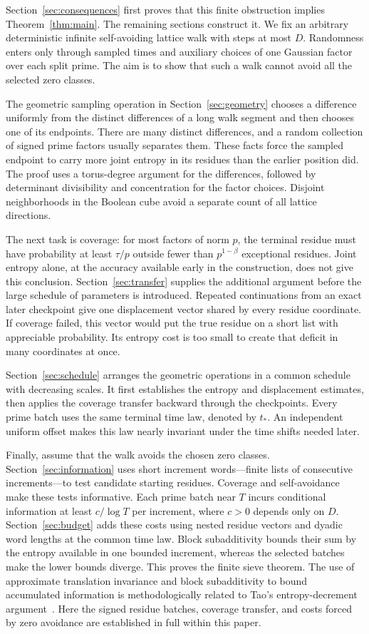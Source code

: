 \documentclass[11pt]{article}
\theoremstyle{definition}
\theoremstyle{remark}
\numberwithin{equation}{section}
\begin{document}
Section~\ref{sec:consequences} first proves that this finite obstruction
implies Theorem~\ref{thm:main}. The remaining sections construct it.
We fix an arbitrary deterministic infinite self-avoiding lattice walk
with steps at most $D$. Randomness enters only through sampled times
and auxiliary choices of one Gaussian factor over each split prime.
The aim is to show that such a walk cannot avoid all the selected zero
classes.

The geometric sampling operation in Section~\ref{sec:geometry} chooses
a difference uniformly from the distinct differences of a long walk
segment and then chooses one of its endpoints. There are many distinct
differences, and a random collection of signed prime factors usually
separates them. These facts force the sampled endpoint to carry more
joint entropy in its residues than the earlier position did. The proof
uses a torus-degree argument for the differences, followed by determinant
divisibility and concentration for the factor choices. Disjoint
neighborhoods in the Boolean cube avoid a separate count of all lattice
directions.

The next task is coverage: for most factors of norm $p$, the terminal
residue must have probability at least $\tau/p$ outside fewer than
$p^{1-\beta}$ exceptional residues. Joint entropy alone, at the accuracy
available early in the construction, does not give this conclusion.
Section~\ref{sec:transfer} supplies the additional argument before the
large schedule of parameters is introduced. Repeated continuations from
an exact later checkpoint give one displacement vector shared by every
residue coordinate. If coverage failed, this vector would put the true
residue on a short list with appreciable probability. Its entropy cost
is too small to create that deficit in many coordinates at once.

Section~\ref{sec:schedule} arranges the geometric operations in a common
schedule with decreasing scales. It first establishes the entropy and
displacement estimates, then applies the coverage transfer backward
through the checkpoints. Every prime batch uses the same terminal time
law, denoted by $t_*$. An independent uniform offset makes this law
nearly invariant under the time shifts needed later.

Finally, assume that the walk avoids the chosen zero classes.
Section~\ref{sec:information} uses short increment words---finite lists
of consecutive increments---to test candidate starting residues.
Coverage and self-avoidance make these tests informative. Each prime
batch near $T$ incurs conditional information at least $c/\log T$ per
increment, where $c>0$ depends only on $D$. Section~\ref{sec:budget}
adds these costs using nested residue vectors and dyadic word lengths
at the common time law. Block subadditivity bounds their sum by the
entropy available in one bounded increment, whereas the selected batches
make the lower bounds diverge. This proves the finite sieve theorem.
The use of approximate translation invariance and block subadditivity
to bound accumulated information is methodologically related to Tao's
entropy-decrement argument~\cite[Section 3]{TaoEntropyDecrement}.
Here the signed residue batches, coverage transfer, and costs forced by
zero avoidance are established in full within this paper.








\end{document}
